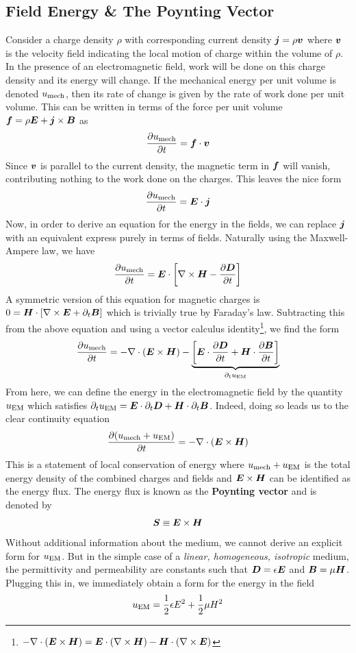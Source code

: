 \documentclass[twocolumn]{gwclass}
\begin{document}
\subsection{Field Energy \& The Poynting Vector}
Consider a charge density $\rho$ with corresponding current density $\boldsymbol{j}=\rho\boldsymbol{v}$ where $\boldsymbol{v}$ is the velocity field indicating the local motion of charge within the volume of $\rho$. In the presence of an electromagnetic field, work will be done on this charge density and its energy will change. If the mechanical energy per unit volume is denoted $u_{\text{\normalfont{mech}}}$, then its rate of change is given by the rate of work done per unit volume. This can be written in terms of the force per unit volume $\boldsymbol{f}=\rho\boldsymbol{E} + \boldsymbol{j}\times\boldsymbol{B}$ as
$$ \frac{\partial u_{\text{\normalfont{mech}}}}{\partial t} = \boldsymbol{f}\cdot\boldsymbol{v} $$
Since $\boldsymbol{v}$ is parallel to the current density, the magnetic term in $\boldsymbol{f}$ will vanish, contributing nothing to the work done on the charges. This leaves the nice form
$$ \frac{\partial u_{\text{\normalfont{mech}}}}{\partial t} = \boldsymbol{E}\cdot\boldsymbol{j} $$
Now, in order to derive an equation for the energy in the fields, we can replace $\boldsymbol{j}$ with an equivalent express purely in terms of fields. Naturally using the Maxwell-Ampere law, we have
$$ \frac{\partial u_{\text{\normalfont{mech}}}}{\partial t} = \boldsymbol{E}\cdot\left[\nabla\times\boldsymbol{H} - \frac{\partial \boldsymbol{D}}{\partial t}\right] $$
A symmetric version of this equation for magnetic charges is
$0 = \boldsymbol{H}\cdot\left[\nabla\times\boldsymbol{E} + \partial_t\boldsymbol{B}\right]$ which is trivially true by Faraday's law. Subtracting this from the above equation and using a vector calculus identity\footnote{$-\nabla\cdot(\boldsymbol{E}\times\boldsymbol{H})= \boldsymbol{E}\cdot(\nabla\times\boldsymbol{H}) - \boldsymbol{H}\cdot(\nabla\times\boldsymbol{E})$}, we find the form
$$ \frac{\partial u_{\text{\normalfont{mech}}}}{\partial t} = -\nabla\cdot(\boldsymbol{E}\times\boldsymbol{H}) - \underbrace{\left[\boldsymbol{E}\cdot\frac{\partial \boldsymbol{D}}{\partial t} + \boldsymbol{H}\cdot\frac{\partial \boldsymbol{B}}{\partial t}\right]}_{\partial_t u_{\text{\normalfont{EM}}}} $$
From here, we can define the energy in the electromagnetic field by the quantity $u_{\text{\normalfont{EM}}}$ which satisfies $ \partial_t u_{\text{\normalfont{EM}}} = \boldsymbol{E}\cdot\partial_t\boldsymbol{D} + \boldsymbol{H}\cdot\partial_t\boldsymbol{B}$. Indeed, doing so leads us to the clear continuity equation
$$ \frac{\partial (u_{\text{\normalfont{mech}}} + u_{\text{\normalfont{EM}}})}{\partial t} = -\nabla\cdot(\boldsymbol{E}\times\boldsymbol{H}) $$
This is a statement of local conservation of energy where $u_{\text{\normalfont{mech}}} +u_{\text{\normalfont{EM}}}$ is the total energy density of the combined charges and fields and $\boldsymbol{E}\times\boldsymbol{H}$ can be identified as the energy flux. The energy flux is known as the \textbf{Poynting vector} and is denoted by
$$ \boldsymbol{S}\equiv \boldsymbol{E}\times\boldsymbol{H} $$
Without additional information about the medium, we cannot derive an explicit form for $u_{\text{\normalfont{EM}}}$. But in the simple case of a \emph{linear, homogeneous, isotropic} medium, the permittivity and permeability are constants such that $\boldsymbol{D}=\epsilon\boldsymbol{E}$ and $\boldsymbol{B}=\mu\boldsymbol{H}$. Plugging this in, we immediately obtain a form for the energy in the field
$$ u_{\text{\normalfont{EM}}} = \frac{1}{2}\epsilon E^2 + \frac{1}{2}\mu H^2 $$
\end{document}
